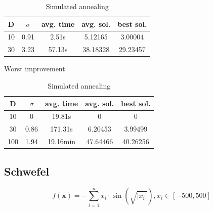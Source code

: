 \documentclass{article}
\begin{document}
\begin{table}[!htbp]
\begin{minipage}{.4\linewidth}
    \centering

    \begin{tabular}{|c|c|c|c|c|}
    \hline
    D   & $\sigma$  & avg. time     & avg. sol.     & best sol. \\
    \hline
    10  & 0.91      & 2.51s         & 5.12165       & 3.00004 \\
    \hline
    30  & 3.23      & 57.13s        & 38.18328      & 29.23457 \\
    \hline
    \end{tabular}
    \caption{Worst improvement}
  \end{minipage}%
  \quad %
  \begin{minipage}{.75\linewidth}
    \centering

    \begin{tabular}{|c|c|c|c|c|}
    \hline
    D   & $\sigma$  & avg. time     & avg. sol.     & best sol. \\
    \hline
    10  & 0         & 19.81s        & 0       & 0 \\
    \hline
    30  & 0.86      & 171.31s       & 6.20453       & 3.99499 \\
    \hline
    100 & 1.94      & 19.16min      & 47.64466      & 40.26256 \\
    \hline
    \end{tabular}
    \caption{Simulated annealing}
  \end{minipage}
\end{table}

\newpage
\setcounter{table}{0}


\subsection{Schwefel}
$$f(\mathbf{x}) = -\sum_{i=1}^{n} x_i \cdot \sin\left(\sqrt{|x_i|}\right) , x_i \in \left[-500,500\right]$$

\end{document}
